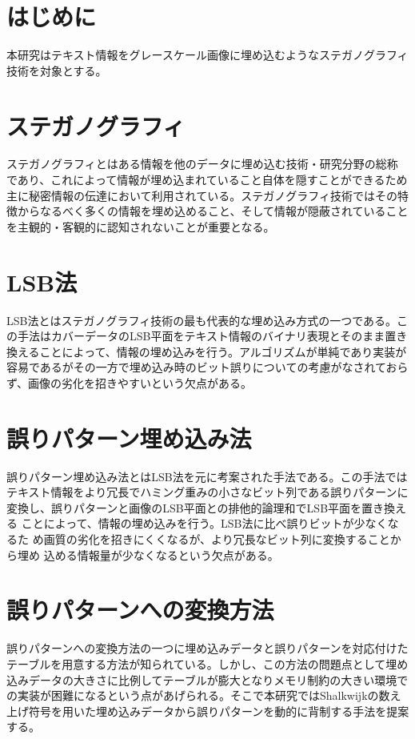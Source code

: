 \documentclass[a4j,fleqn,10pt]{jsarticle}
\begin{document}

\maketitle


\section{はじめに}
本研究はテキスト情報をグレースケール画像に埋め込むようなステガノグラフィ
技術を対象とする。


\section{ステガノグラフィ}
ステガノグラフィとはある情報を他のデータに埋め込む技術・研究分野の総称
であり、これによって情報が埋め込まれていること自体を隠すことができるため
主に秘密情報の伝達において利用されている。ステガノグラフィ技術ではその特
徴からなるべく多くの情報を埋め込めること、そして情報が隠蔽されていること
を主観的・客観的に認知されないことが重要となる。

\section{LSB法}
LSB法とはステガノグラフィ技術の最も代表的な埋め込み方式の一つである。こ
の手法はカバーデータのLSB平面をテキスト情報のバイナリ表現とそのまま置き
換えることによって、情報の埋め込みを行う。アルゴリズムが単純であり実装が
容易であるがその一方で埋め込み時のビット誤りについての考慮がなされておら
ず、画像の劣化を招きやすいという欠点がある。

\section{誤りパターン埋め込み法}
誤りパターン埋め込み法とはLSB法を元に考案された手法である。この手法では
テキスト情報をより冗長でハミング重みの小さなビット列である誤りパターンに
変換し、誤りパターンと画像のLSB平面との排他的論理和でLSB平面を置き換える
ことによって、情報の埋め込みを行う。LSB法に比べ誤りビットが少なくなるた
め画質の劣化を招きにくくなるが、より冗長なビット列に変換することから埋め
込める情報量が少なくなるという欠点がある。

\section{誤りパターンへの変換方法}
誤りパターンへの変換方法の一つに埋め込みデータと誤りパターンを対応付けた
テーブルを用意する方法が知られている。しかし、この方法の問題点として埋め
込みデータの大きさに比例してテーブルが膨大となりメモリ制約の大きい環境で
の実装が困難になるという点があげられる\cite{Paper01}。そこで本研究ではShalkwijkの数え
上げ符号\cite{Paper02}を用いた埋め込みデータから誤りパターンを動的に背制する手法を提案
する。
\end{document}
